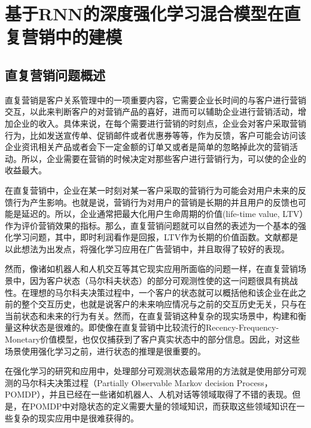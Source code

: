 \chapter{基于RNN的深度强化学习混合模型在直复营销中的建模}


\section{直复营销问题概述}
直复营销是客户关系管理中的一项重要内容，它需要企业长时间的与客户进行营销交互，以此来判断客户的对营销产品的喜好，进而可以辅助企业进行营销活动，增加企业的收入。具体来说，在每个需要进行营销的时刻点，企业会对客户采取营销行为，比如发送宣传单、促销邮件或者优惠券等等，作为反馈，客户可能会访问该企业资讯相关产品或者会下一定金额的订单又或者是简单的忽略掉此次的营销活动。所以，企业需要在营销的时候决定对那些客户进行营销行为，可以使的企业的收益最大。

在直复营销中，企业在某一时刻对某一客户采取的营销行为可能会对用户未来的反馈行为产生影响。也就是说，营销行为对用户的营销是长期的并且用户的反馈也可能是延迟的。所以，企业通常把最大化用户生命周期的价值(life-time value, LTV）作为评价营销效果的指标\citep{dwyer1997customer}。那么，直复营销问题就可以自然的表述为一个基本的强化学习问题，其中，即时利润看作是回报，LTV作为长期的价值函数。文献\citep{tkachenko2015autonomous,pednault2002sequential,silver2013concurrent}都是以此想法为出发点，将强化学习应用在广告营销中，并且取得了较好的表现。

然而，像诸如机器人和人机交互等其它现实应用所面临的问题一样，在直复营销场景中，因为客户状态（马尔科夫状态）的部分可观测性使的这一问题很具有挑战性。在理想的马尔科夫决策过程中，一个客户的状态就可以概括他和该企业在此之前的整个交互历史，也就是说客户的未来响应情况与之前的交互历史无关，只与在当前状态和未来的行为有关。然而，在直复营销这种复杂的现实场景中，构建和衡量这种状态是很难的。即使像在直复营销中比较流行的Recency-Frequency-Monetary价值模型，也仅仅捕获到了客户真实状态中的部分信息。因此，对这些场景使用强化学习之前，进行状态的推理是很重要的。

在强化学习的研究和应用中，处理部分可观测状态最常用的方法就是使用部分可观测的马尔科夫决策过程（Partially Observable Markov decision Process，POMDP）\citep{kaelbling1998planning}，并且已经在一些诸如机器人、人机对话等领域取得了不错的表现。但是，在POMDP中对隐状态的定义需要大量的领域知识，而获取这些领域知识在一些复杂的现实应用中是很难获得的。


